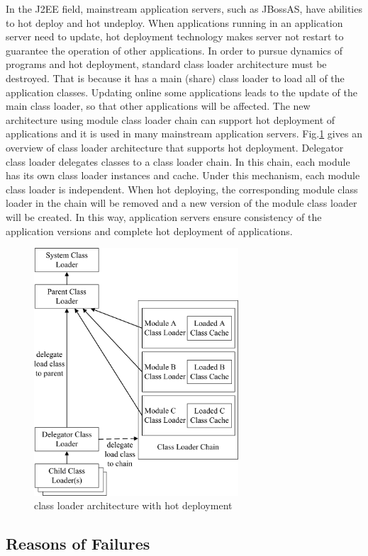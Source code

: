 \documentclass[conference]{IEEEtran}
\begin{document}
In the J2EE\cite{j2ee} field, mainstream application servers, such as JBossAS, have abilities to hot deploy and hot undeploy.  
When applications running in an application server need to update, hot deployment technology makes server not restart to guarantee the operation of  other applications.
In order to pursue dynamics of programs and hot deployment, standard class loader\cite{standard_cl} architecture must be destroyed.
That is because it has a main (share) class loader to load all of the application classes.
Updating online some applications leads to the update of the main class loader, so that other applications will be affected.
The new architecture using module class loader chain can support hot deployment of applications and it is used in many mainstream application servers.
Fig.\ref{fig:module_cl} gives an overview of class loader architecture that supports hot deployment.
Delegator class loader delegates classes to a class loader chain.
In this chain, each module has its own class loader instances and cache.
Under this mechanism, each module class loader is independent.
When hot deploying, the corresponding module class loader in the chain will be removed and a new version of the module class loader will be created.
In this way, application servers ensure consistency of the application versions and complete hot deployment of applications\cite{module_cl}.

\begin{figure}[!t]
\centering
\includegraphics[width=3.0in]{module_class_loader.jpg}
\caption{class loader architecture with hot deployment}
\label{fig:module_cl}
\end{figure}


\subsection{Reasons of Failures}
\end{document}
